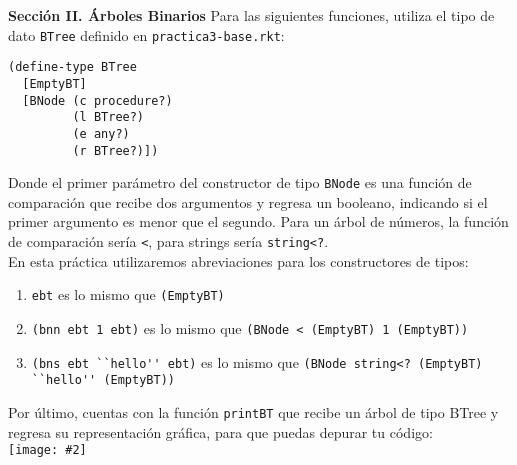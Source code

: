 \documentclass{article}
\newcommand{\jimage}[2]{\texttt{[image: \#2]}\vskip10pt}
\begin{document}
\textbf{Sección II. Árboles Binarios}
Para las siguientes funciones, utiliza el tipo de dato \verb;BTree;
definido en \verb;practica3-base.rkt;:
\begin{verbatim}
(define-type BTree
  [EmptyBT]
  [BNode (c procedure?)
         (l BTree?)
         (e any?)
         (r BTree?)])
\end{verbatim}

Donde el primer parámetro del constructor de tipo \verb;BNode; es una función de comparación que recibe dos argumentos y regresa un booleano, indicando si el primer argumento es menor que el segundo. Para un árbol de números, la función de comparación sería \verb;<;, para strings sería \verb;string<?;. \\
    
En esta práctica utilizaremos abreviaciones para los constructores de tipos:

\begin{enumerate}
\item \verb;ebt; es lo mismo que \verb;(EmptyBT);
\item \verb;(bnn ebt 1 ebt); es lo mismo que \verb;(BNode < (EmptyBT) 1 (EmptyBT));
\item \verb;(bns ebt ``hello'' ebt); es lo mismo que \verb;(BNode string<? (EmptyBT) ``hello'' (EmptyBT));
\end{enumerate}

Por último, cuentas con la función \verb;printBT; que recibe un árbol de tipo BTree y regresa su representación gráfica, para que puedas depurar tu código: \\

\jimage{0.9}{imgs/printbt1.png}
\end{document}
